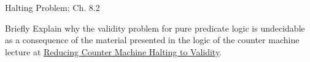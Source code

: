 \documentclass[handout]{mcs}
\begin{document}

\begin{staffnotes}
	Halting Problem;  Ch. 8.2
\end{staffnotes}

\begin{problem}
Briefly Explain why the validity problem for pure predicate logic is
undecidable as a consequence of the material presented in the logic of
the counter machine lecture at
\href{https://courses.csail.mit.edu/6.042/spring16/predicate-logic7.pdf}{Reducing
  Counter Machine Halting to Validity}.

\begin{solution}

\end{solution}

\end{problem}





\end{document}
